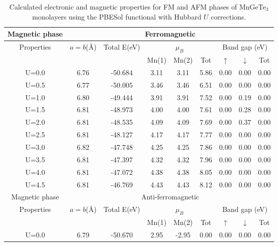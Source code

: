 \begin{table}[H]
	\centering
	\setlength{\extrarowheight}{0.5ex}
	\caption{Calculated electronic and magnetic properties for FM and AFM phases of MnGeTe$_3$ monolayers using the PBESol functional with Hubbard $U$ corrections.}
	\begin{tabular}{cccccc|ccc}
		\toprule
		\toprule
		\rowcolor{WhiteSmoke!70!Lavender}
		Magnetic phase & \multicolumn{8}{c}{Ferromagnetic} \\
		\midrule
		\multirow{2}{*}{Properties}& \multirow{2}{*}{$a=b$(\AA)}& \multirow{2}{*}{Total E(eV)} & \multicolumn{3}{c}{$\mu_{B}$} & \multicolumn{3}{c}{Band gap (eV)}  \\
		\cline{4-9}
		&  & & Mn(1)& Mn(2) & Tot  & $\uparrow$ & $\downarrow$ &  Tot \\
		\midrule
		U=0.0 & 6.76 & -50.684 & 3.11 & 3.11 & 5.86 & 0.00 & 0.00 & 0.00 \\
		U=0.5 & 6.77 & -50.005 & 3.46 & 3.46 & 6.51 & 0.00 & 0.00 & 0.00 \\
		U=1.0 & 6.80 & -49.444 & 3.91 & 3.91 & 7.52 & 0.00 & 0.19 & 0.00 \\
		U=1.5 & 6.81 & -48.973 & 4.00 & 4.00 & 7.61 & 0.00 & 0.28 & 0.00 \\
		U=2.0 & 6.81 & -48.535 & 4.09 & 4.09 & 7.69 & 0.00 & 0.37 & 0.00 \\
		U=2.5 & 6.81 & -48.127 & 4.17 & 4.17 & 7.77 & 0.00 & 0.00 & 0.00 \\
		U=3.0 & 6.82 & -47.748 & 4.25 & 4.25 & 7.86 & 0.00 & 0.00 & 0.00 \\
		U=3.5 & 6.81 & -47.397 & 4.32 & 4.32 & 7.96 & 0.00 & 0.00 & 0.00 \\
		U=4.0 & 6.81 & -47.072 & 4.38 & 4.38 & 8.05 & 0.00 & 0.00 & 0.00 \\
		U=4.5 & 6.81 & -46.769 & 4.43 & 4.43 & 8.12 & 0.00 & 0.00 & 0.00 \\
		\midrule
		\rowcolor{WhiteSmoke!70!Lavender}
		Magnetic phase & \multicolumn{8}{c}{Anti-ferromagnetic} \\
		\midrule
		\multirow{2}{*}{Properties} & \multirow{2}{*}{$a=b$(\AA)}& \multirow{2}{*}{Total E(eV)} & \multicolumn{3}{c}{$\mu_{B}$} & \multicolumn{3}{c}{Band gap (eV)}  \\
		\cline{4-9}
		&  & & Mn(1)& Mn(2) & Tot  & $\uparrow$ & $\downarrow$ &  Tot \\
		\midrule
		U=0.0 & 6.79 & -50.670 & 2.95 & -2.95 & 0.00 & 0.00 & 0.00 & 0.00 \\

\end{tabular}
\end{table}
